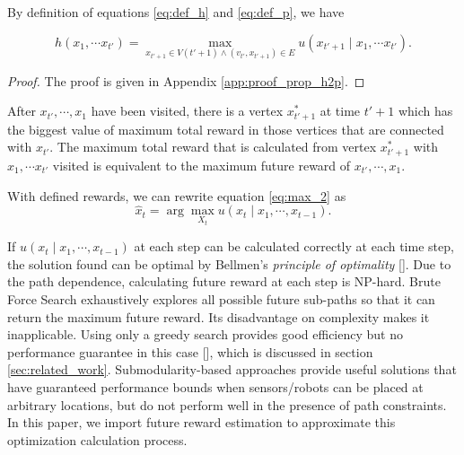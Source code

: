 \documentclass[12pt]{article}
\begin{document}
By definition of equations \eqref{eq:def_h} and \eqref{eq:def_p}, we have 
\begin{propty}
\label{prop:h2p}
\begin{equation}
\label{eq:h2p}
h( x_{1}, \cdots x_{t'} ) = \max_{x_{t'+1} \in V(t'+1) \land (v_{t'}, x_{t'+1}) \in E} u(x_{t'+1} \mid x_{1}, \cdots x_{t'} ).
\end{equation}
\begin{proof}
The proof is given in Appendix \ref{app:proof_prop_h2p}.
\end{proof}
\end{propty}
After $ x_{t'}, \cdots , x_{1} $ have been visited, there is a vertex $ x^{*}_{t'+1} $ at time $ t' + 1 $ which has the biggest value of maximum total reward in those vertices that are connected with $ x_{t'} $. 
The maximum total reward that is calculated from vertex $ x^{*}_{t'+1} $ with $ x_{1}, \cdots x_{t'} $ visited is equivalent to the maximum future reward of $ x_{t'}, \cdots , x_{1} $.

With defined rewards, we can rewrite equation \eqref{eq:max_2} as
\begin{equation}
\label{eq:max_21}
\hat{x}_{t} = \arg \max_{X_{t}} u(x_{t} \mid x_{1} , \cdots , x_{t-1}).
\end{equation}

If $ u(x_{t} \mid x_{1} , \cdots , x_{t-1}) $ at each step can be calculated correctly at each time step, the solution found can be optimal by Bellmen's \emph{principle of optimality} [\cite{lewis1986optimal}].
Due to the path dependence, calculating future reward at each step is NP-hard.
Brute Force Search exhaustively explores all possible future sub-paths so that it can return the maximum future reward.
Its disadvantage on complexity makes it inapplicable.
Using only a greedy search provides good efficiency but no performance guarantee in this case [\cite{krause2012submodular}], which is discussed in section \ref{sec:related_work}.
Submodularity-based approaches provide useful solutions that have guaranteed performance bounds when sensors/robots can be placed at arbitrary locations, but do not perform well in the presence of path constraints.
In this paper, we import future reward estimation to approximate this optimization calculation process.
\end{document}
